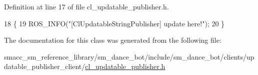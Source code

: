 Definition at line 17 of file cl\+\_\+updatable\+\_\+publisher.\+h.


\begin{DoxyCode}
18     \{
19         ROS\_INFO(\textcolor{stringliteral}{"[ClUpdatableStringPublisher] update here!"});
20     \}
\end{DoxyCode}


The documentation for this class was generated from the following file\+:\begin{DoxyCompactItemize}
\item 
smacc\+\_\+sm\+\_\+reference\+\_\+library/sm\+\_\+dance\+\_\+bot/include/sm\+\_\+dance\+\_\+bot/clients/updatable\+\_\+publisher\+\_\+client/\hyperlink{sm__dance__bot_2include_2sm__dance__bot_2clients_2updatable__publisher__client_2cl__updatable__publisher_8h}{cl\+\_\+updatable\+\_\+publisher.\+h}\end{DoxyCompactItemize}
